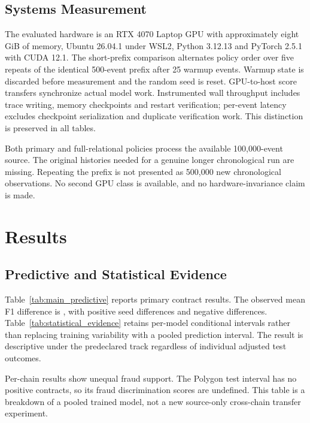 \documentclass[10pt,journal]{IEEEtran}
\begin{document}
\subsection{Systems Measurement}
The evaluated hardware is an RTX 4070 Laptop GPU with approximately eight GiB of memory, Ubuntu 26.04.1 under WSL2, Python 3.12.13 and PyTorch 2.5.1 with CUDA 12.1. The short-prefix comparison alternates policy order over five repeats of the identical 500-event prefix after 25 warmup events. Warmup state is discarded before measurement and the random seed is reset. GPU-to-host score transfers synchronize actual model work. Instrumented wall throughput includes trace writing, memory checkpoints and restart verification; per-event latency excludes checkpoint serialization and duplicate verification work. This distinction is preserved in all tables.

Both primary and full-relational policies process the available 100,000-event source. The original histories needed for a genuine longer chronological run are missing. Repeating the prefix is not presented as 500,000 new chronological observations. No second GPU class is available, and no hardware-invariance claim is made.

\section{Results}
\subsection{Predictive and Statistical Evidence}
Table~\ref{tab:main_predictive} reports primary contract results. The observed mean F1 difference is \DeltaFOne{}, with \PositiveSeeds{} positive seed differences and \NegativeSeeds{} negative differences. Table~\ref{tab:statistical_evidence} retains per-model conditional intervals rather than replacing training variability with a pooled prediction interval. The result is descriptive under the predeclared track regardless of individual adjusted test outcomes.



Per-chain results show unequal fraud support. The Polygon test interval has no positive contracts, so its fraud discrimination scores are undefined. This table is a breakdown of a pooled trained model, not a new source-only cross-chain transfer experiment.
\end{document}
